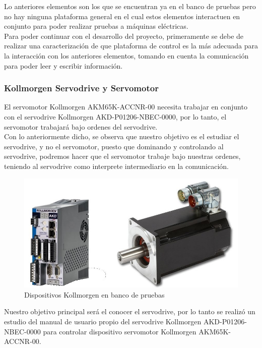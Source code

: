 \documentclass[12pt,titlepage]{article}
\begin{document}
Lo anteriores elementos son los que se encuentran ya en el banco de pruebas pero no hay ninguna plataforma general en el cual estos elementos interactuen en conjunto para poder realizar pruebas a máquinas eléctricas.\\

Para poder continuar con el desarrollo del proyecto, primeramente se debe de realizar una caracterización de que plataforma de control es la más adecuada para la interacción con los anteriores elementos, tomando en cuenta la comunicación para poder leer y escribir información. \\ 

\subsubsection{Kollmorgen Servodrive y Servomotor}
El servomotor Kollmorgen AKM65K-ACCNR-00 necesita trabajar en conjunto con el servodrive Kollmorgen AKD-P01206-NBEC-0000, por lo tanto, el servomotor trabajará bajo ordenes del servodrive. \\

Con lo anteriormente dicho, se observa que nuestro objetivo es el estudiar el servodrive, y no el servomotor, puesto que dominando y controlando al servodrive, podremos hacer que el servomotor trabaje bajo nuestras ordenes, teniendo al servodrive como interprete intermediario en la comunicación. \\ 

\begin{figure}[htbp]
\hspace*{2.5cm} 
\includegraphics[scale=0.55]{kollmorge_devices}
\caption{Dispositivos Kollmorgen en banco de pruebas}
\end{figure}
\newpage
Nuestro objetivo principal será el conocer el servodrive, por lo tanto se realizó un estudio del manual de usuario propio del servodrive Kollmorgen AKD-P01206-NBEC-0000 para controlar dispositivo servomotor Kollmorgen AKM65K-ACCNR-00. \\ 
\end{document}
